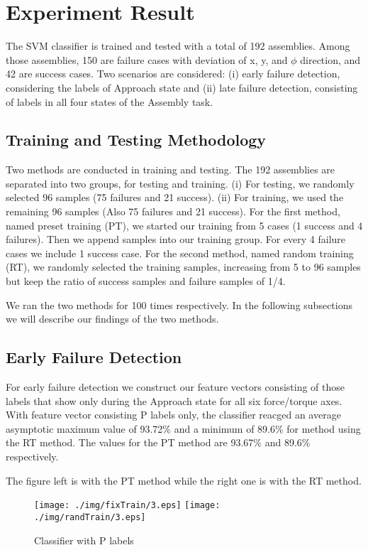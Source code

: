 \chapter{Experiment Result}
The SVM classifier is trained and tested with a total of 192 assemblies. Among those assemblies, 150 are failure cases with deviation of x, y, and $\phi$ direction, and 42 are success cases. Two scenarios are considered: (i) early failure detection, considering the labels of Approach state and (ii) late failure detection, consisting of labels in all four states of the Assembly task.
\section{Training and Testing Methodology}
Two methods are conducted in training and testing. The 192 assemblies are separated into two groups, for testing and training. (i) For testing, we randomly selected 96 samples (75 failures and 21 success). (ii) For training, we used the remaining 96 samples (Also 75 failures and 21 success). For the first method, named preset training (PT), we started our training from 5 cases (1 success and 4 failures). Then we append samples into our training group. For every 4 failure cases we include 1 success case. For the second method, named random training (RT), we randomly selected the training samples, increasing from 5 to 96 samples but keep the ratio of success samples and failure samples of 1/4.  

We ran the two methods for 100 times respectively. In the following subsections we will describe our findings of the two methods.
\section{Early Failure Detection}
For early failure detection we construct our feature vectors consisting of those labels that show only during the Approach state for all six force/torque axes. With feature vector consisting P labels only, the classifier reacged an average asymptotic maximum value of 93.72\% and a minimum of 89.6\% for method using the RT method. The values for the PT method are 93.67\% and 89.6\% respectively.

\indent The figure left is with the PT method while the right one is with the RT method.
\begin{figure}[h]
    \centering
    \texttt{[image: ./img/fixTrain/3.eps]}
    \texttt{[image: ./img/randTrain/3.eps]}
    \caption{Classifier with P labels}
    \label{P}
\end{figure}
